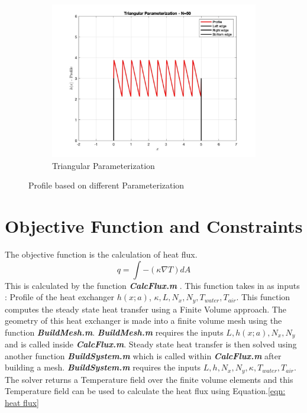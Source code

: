 \documentclass{article}
\begin{document}
\begin{figure}[h]
\begin{subfigure}[b]{0.4\textwidth}
         \centering
         \includegraphics[width=\textwidth]{Triangular_Parameterization}
         \caption{Triangular Parameterization}
         \label{fig:triangular}
     \end{subfigure}
        \caption{Profile based on different Parameterization}
        \label{fig:three graphs}
\end{figure}
\section{Objective Function and Constraints}
The objective function is the calculation of heat flux. 
\begin{equation}
q = \int -(\kappa \nabla T )dA
\label{eqn: heat flux}
\end{equation}
This is calculated by the function \textit{\textbf{CalcFlux.m}} . This function takes in as inputs : Profile of the heat exchanger $h(x;a)$, $\kappa, L, N_x, N_y, T_{water}, T_{air}$. This function computes the steady state heat transfer using a Finite Volume approach. The geometry of this heat exchanger is made into a finite volume mesh using the function \textit{\textbf{BuildMesh.m}}. \textit{\textbf{BuildMesh.m}} requires the inputs $L, h(x;a), N_x, N_y$ and is called inside \textit{\textbf{CalcFlux.m}}. Steady state heat transfer is then solved using another function \textit{\textbf{BuildSystem.m}} which is called within \textit{\textbf{CalcFlux.m}} after building a mesh. \textit{\textbf{BuildSystem.m}} requires the inputs $L,h,N_x,N_y,\kappa, T_{water}, T_{air}$. The solver returns a Temperature field over the finite volume elements and this Temperature field can be used to calculate the heat flux using Equation.\ref{eqn: heat flux}
\end{document}
